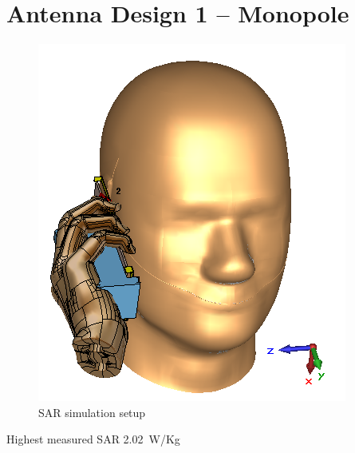 \section{Antenna Design 1 -- Monopole}


\begin{figure}[htbp]%
  \centering
  \includegraphics{img/tech_sol/monopole/sol1_sar}
  \caption{SAR simulation setup}
  \label{fig:ant1_sar}
\end{figure}

Highest measured SAR \SI{2.02}{W/Kg}

